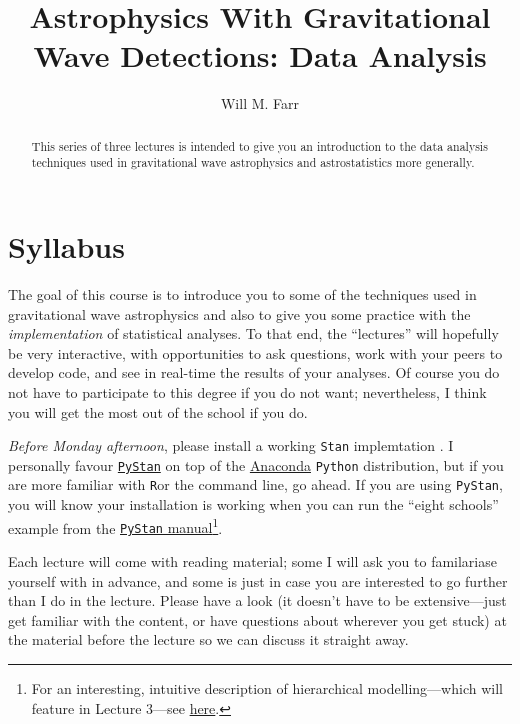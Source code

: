 \documentclass[modern]{aastex61}
\newcommand{\pystan}{\texttt{PyStan}}
\newcommand{\python}{\texttt{Python}}
\newcommand{\RRR}{\texttt{R}}
\newcommand{\stan}{\texttt{Stan}}
\begin{document}
\title{Astrophysics With Gravitational Wave Detections: Data Analysis}
\author{Will M. Farr}

\begin{abstract}
  This series of three lectures is intended to give you an
  introduction to the data analysis techniques used in gravitational
  wave astrophysics and astrostatistics more generally.  
\end{abstract}

\section{Syllabus}

The goal of this course is to introduce you to some of the techniques
used in gravitational wave astrophysics and also to give you some
practice with the \emph{implementation} of statistical analyses.  To
that end, the ``lectures'' will hopefully be very interactive, with
opportunities to ask questions, work with your peers to develop code,
and see in real-time the results of your analyses.  Of course you do
not have to participate to this degree if you do not want;
nevertheless, I think you will get the most out of the school if you
do.

\emph{Before Monday afternoon}, please install a working \stan{}
implemtation \citep{Stan}.  I personally favour
\href{http://mc-stan.org}{\pystan} \citep{PyStan} on top of the
\href{https://www.continuum.io}{Anaconda} \python{} distribution, but
if you are more familiar with \RRR or the command line, go ahead.  If
you are using \pystan{}, you will know your installation is working
when you can run the ``eight schools'' example from the
\href{https://pystan.readthedocs.io/en/latest/getting_started.html}{\pystan{}
  manual}\footnote{For an interesting, intuitive description of
  hierarchical modelling---which will feature in Lecture 3---see
  \href{http://andrewgelman.com/2014/01/21/everything-need-know-bayesian-statistics-learned-eight-schools/}{here}.}.

Each lecture will come with reading material; some I will ask you to
familariase yourself with in advance, and some is just in case you are
interested to go further than I do in the lecture.  Please have a look
(it doesn't have to be extensive---just get familiar with the content,
or have questions about wherever you get stuck) at the material before
the lecture so we can discuss it straight away.
\end{document}
